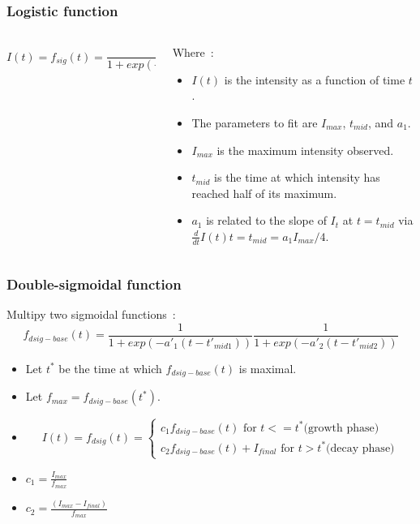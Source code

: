 \documentclass[aspectratio=169]{beamer}
\begin{document}
\begin{frame}
    \frametitle{Logistic function}
    \begin{columns}
        \begin{column}{0.6\linewidth}
            \begin{equation}
                I(t) = f_{sig}(t) = \frac{I_{max}}
                { 1 + exp(-a_{1}(t - t_{mid}))}
            \end{equation}
        \end{column}
        \begin{column}{0.4\linewidth}
            Where~\cite{caglar2018}:
            \begin{itemize}
                \item $I(t)$ is the intensity as a function of time $t$.
                \item The parameters to fit are $I_{max}$, $t_{mid}$, and $a_{1}$.
                \item $I_{max}$ is the maximum intensity observed.
                \item $t_{mid}$ is the time at which intensity has reached half of its
                    maximum.
                \item $a_{1}$ is related to the slope of $I_{t}$ at $t = t_{mid}$ via 
                    $\frac{d}{dt} I(t)t = t_{mid} = a_{1}I_{max}/4$.
            \end{itemize}
        \end{column}
    \end{columns}
\end{frame}

\begin{frame}
    \frametitle{Double-sigmoidal function}
    Multipy two sigmoidal functions~\cite{caglar2018}:
    \begin{equation}
        f_{dsig-base}(t) = \frac{1}{1 + exp(-a'_{1}(t -t'_{mid1}))}
        \frac{1}{1 + exp(-a'_{2}(t -t'_{mid2}))}
    \end{equation}
    \begin{itemize}
        \item Let $t^*$ be the time at which $f_{dsig-base}(t)$ is maximal.
        \item Let $f_{max} = f_{dsig-base}(t^*)$.
        \item \begin{equation*}
                I(t) = f_{dsig}(t) = 
                \left\{
                    \begin{array}{rl}
                        c_{1}  f_{dsig-base}(t) \text{ for } t <= t^* \text{(growth phase)} \\
                        c_{2}  f_{dsig-base}(t) + I_{final} \text{ for } t > t^* \text{(decay phase)}
                    \end{array} \right.
        \end{equation*}
    \item $c_{1} = \frac{I_{max}}{f_{max}}$
    \item $c_{2} = \frac{(I_{max} - I_{final})}{f_{max}}$
    \end{itemize}
\end{frame}
\end{document}
